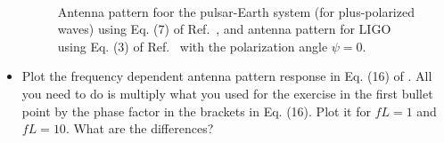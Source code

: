 \documentclass[prd,floatfix,preprintnumbers,amsmath,amssymb,nofootinbib,superscriptaddress]{revtex4}
\begin{document}
\begin{itemize}
\begin{figure}
\centering
\mbox{\quad
{}}
\caption{Antenna pattern foor the pulsar-Earth system (for plus-polarized waves) using Eq. (7) of Ref.~\cite{Anholm},
and antenna pattern for LIGO using Eq. (3) of Ref.~\cite{Kazu} with the polarization angle $\psi=0$.
} 
\end{figure}



\item Plot the frequency dependent antenna pattern response in Eq. (16) of \cite{Anholm}.  All you need to do 
is multiply what you used for the exercise in the first bullet point by the phase factor in the brackets in Eq. (16).  
Plot it for $fL=1$ and $fL=10$.  What are the differences? 


\end{itemize}
\end{document}
